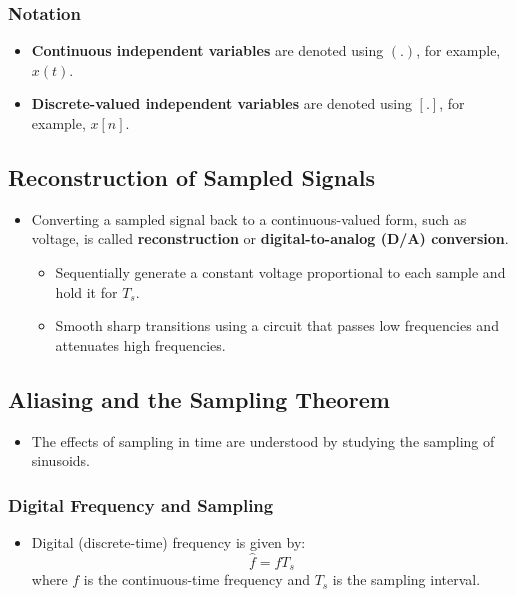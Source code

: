 \documentclass[12pt, letterpaper]{article}
\begin{document}
\subsubsection*{Notation}
\begin{itemize}
    \item \textbf{Continuous independent variables} are denoted using \((.)\), for example, \( x(t) \).
    \item \textbf{Discrete-valued independent variables} are denoted using \([.]\), for example, \( x[n] \).
\end{itemize}

\subsection{Reconstruction of Sampled Signals}
\begin{itemize}
    \item Converting a sampled signal back to a continuous-valued form, such as voltage, is called \textbf{reconstruction} or \textbf{digital-to-analog (D/A) conversion}.
    \begin{itemize}
        \item Sequentially generate a constant voltage proportional to each sample and hold it for \( T_s \).
        \item Smooth sharp transitions using a circuit that passes low frequencies and attenuates high frequencies.
    \end{itemize}
\end{itemize}

\subsection{Aliasing and the Sampling Theorem}
\begin{itemize}
    \item The effects of sampling in time are understood by studying the sampling of sinusoids.
\end{itemize}

\subsubsection{Digital Frequency and Sampling}
\begin{itemize}
    \item Digital (discrete-time) frequency is given by:
    \[
    \hat{f} = f T_s
    \]
    where \( f \) is the continuous-time frequency and \( T_s \) is the sampling interval.
\end{itemize}
\end{document}
